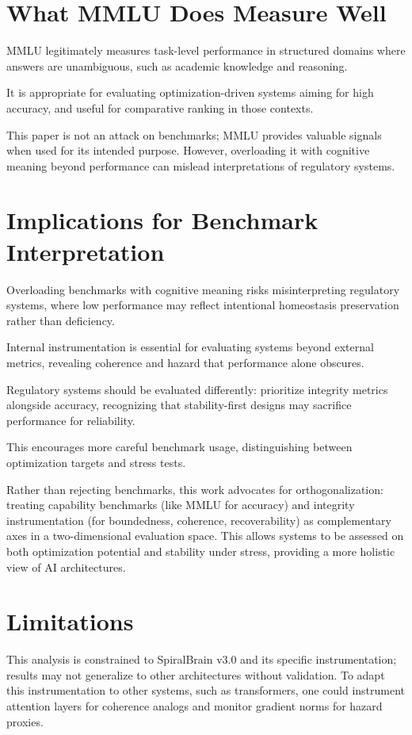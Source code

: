 \documentclass[12pt,a4paper]{article}
\begin{document}
\section{What MMLU Does Measure Well}

MMLU legitimately measures task-level performance in structured domains where answers are unambiguous, such as academic knowledge and reasoning.

It is appropriate for evaluating optimization-driven systems aiming for high accuracy, and useful for comparative ranking in those contexts.

This paper is not an attack on benchmarks; MMLU provides valuable signals when used for its intended purpose. However, overloading it with cognitive meaning beyond performance can mislead interpretations of regulatory systems.

\section{Implications for Benchmark Interpretation}

Overloading benchmarks with cognitive meaning risks misinterpreting regulatory systems, where low performance may reflect intentional homeostasis preservation rather than deficiency.

Internal instrumentation is essential for evaluating systems beyond external metrics, revealing coherence and hazard that performance alone obscures.

Regulatory systems should be evaluated differently: prioritize integrity metrics alongside accuracy, recognizing that stability-first designs may sacrifice performance for reliability.

This encourages more careful benchmark usage, distinguishing between optimization targets and stress tests.

Rather than rejecting benchmarks, this work advocates for orthogonalization: treating capability benchmarks (like MMLU for accuracy) and integrity instrumentation (for boundedness, coherence, recoverability) as complementary axes in a two-dimensional evaluation space. This allows systems to be assessed on both optimization potential and stability under stress, providing a more holistic view of AI architectures.

\section{Limitations}

This analysis is constrained to SpiralBrain v3.0 and its specific instrumentation; results may not generalize to other architectures without validation. To adapt this instrumentation to other systems, such as transformers, one could instrument attention layers for coherence analogs and monitor gradient norms for hazard proxies.
\end{document}
